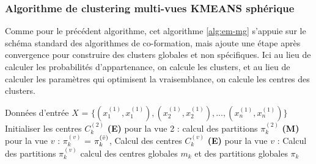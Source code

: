 \documentclass[12pt, french, latin.medieval, a4paper]{report}
\begin{document}
        	\subsubsection{Algorithme de clustering multi-vues KMEANS sphérique}
            	Comme pour le précédent algorithme, cet algorithme \ref{alg:em-mg} s'appuie sur le schéma standard des algorithmes de co-formation, mais ajoute une étape après convergence pour construire
            	des clusters globales et non spécifiques.
            	Ici au lieu de calculer les probabilités d'appartenance, on calcule les clusters, et au lieu de calculer les paramètres qui optimisent la vraisemblance, on calcule les centres des clusters.
            	\begin{algorithm}[H]
                	\caption{Pseudo code de l'algorithme multi-vues KMEANS sphérique}
                	\label{alg:em-mg}
                	\begin{algorithmic}[1]
                 	\REQUIRE Données d'entrée $X$ = $\{ (x_{1}^{(1)}, x_{1}^{(1)}), (x_{2}^{(1)}, x_{2}^{(1)}), ..., (x_{n}^{(1)}, x_{n}^{(1)}) \}$
                 	\STATE Initialiser les centres $C_{k}^{(2)}$
                 	\STATE \textbf{(E)} pour la vue 2 : calcul des partitions $\pi_{k}^{(2)}$
                       	\STATE \textbf{(M)} pour la vue $v$ : $\pi_{k}^{(v)}$ = $\pi_{k}^{(\Bar{v})}$, Calcul des centres $C_{k}^{(v)}$
                       	\STATE \textbf{(E)} pour la vue $v$ : Calcul des partitions $\pi_{k}^{(v)}$
                   	\ENDFOR
                 	\ENDWHILE
                 	\STATE calcul des centres globales $m_k$ et des partitions globales $\pi_k$
                	\end{algorithmic}
           	\end{algorithm}
\end{document}
